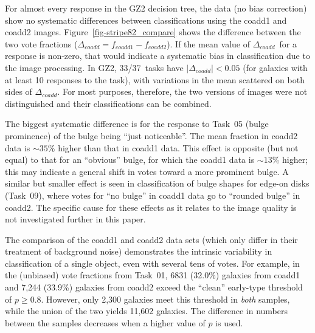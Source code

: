 \documentclass[useAMS,usenatbib]{mn2e}
\newcommand{\dcoadd}{$\Delta_{coadd}$}
\begin{document}

For almost every response in the GZ2 decision tree, the data (no bias correction) show no systematic differences between classifications using the coadd1 and coadd2 images. Figure~\ref{fig-stripe82_compare} shows the difference between the two vote fractions ($\Delta_{coadd} = f_{coadd1} - f_{coadd2}$). If the mean value of \dcoadd~for a response is non-zero, that would indicate a systematic bias in classification due to the image processing. In GZ2, 33/37~tasks have $|\Delta_{coadd}| < 0.05$ (for galaxies with at least 10 responses to the task), with variations in the mean scattered on both sides of \dcoadd. For most purposes, therefore, the two versions of images were not distinguished and their classifications can be combined. 

The biggest systematic difference is for the response to Task~05 (bulge prominence) of the bulge being ``just noticeable''. The mean fraction in coadd2 data is $\sim35\%$ higher than that in coadd1 data. This effect is opposite (but not equal) to that for an ``obvious'' bulge, for which the coadd1 data is $\sim13\%$ higher; this may indicate a general shift in votes toward a more prominent bulge. A similar but smaller effect is seen in classification of bulge shapes for edge-on disks (Task~09), where votes for ``no bulge'' in coadd1 data go to ``rounded bulge'' in coadd2. The specific cause for these effects as it relates to the image quality is not investigated further in this paper. 

The comparison of the coadd1 and coadd2 data sets (which only differ in their treatment of background noise) demonstrates the intrinsic variability in classification of a single object, even with several tens of votes. For example, in the (unbiased) vote fractions from Task~01, 6831 (32.0\%) galaxies from coadd1 and 7,244 (33.9\%) galaxies from coadd2 exceed the ``clean'' early-type threshold of $p\geq0.8$. However, only 2,300 galaxies meet this threshold in {\em both} samples, while the union of the two yields 11,602 galaxies. The difference in numbers between the samples decreases when a higher value of $p$ is used. 
\end{document}

